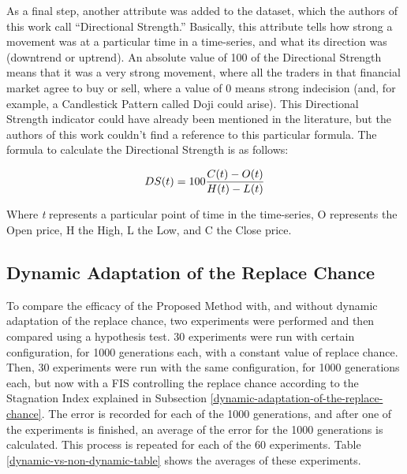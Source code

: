 \documentclass[12pt,journal,draftcls,onecolumn]{IEEEtran}
\begin{document}
As a final step, another attribute was added to the dataset, which the authors of this work call ``Directional Strength.'' Basically, this attribute tells how strong a movement was at a particular time in a time-series, and what its direction was (downtrend or uptrend). An absolute value of 100 of the Directional Strength means that it was a very strong movement, where all the traders in that financial market agree to buy or sell, where a value of 0 means strong indecision (and, for example, a Candlestick Pattern called Doji could arise). This Directional Strength indicator could have already been mentioned in the literature, but the authors of this work couldn't find a reference to this particular formula. The formula to calculate the Directional Strength is as follows:

\begin{equation} \label{directional-strength}
  DS(t) = 100{{C(t) - O(t)} \over {H(t) - L(t)}}
\end{equation}

Where \textit{t} represents a particular point of time in the time-series, O represents the Open price, H the High, L the Low, and C the Close price.

\subsection{Dynamic Adaptation of the Replace Chance}

To compare the efficacy of the Proposed Method with, and without dynamic adaptation of the replace chance, two experiments were performed and then compared using a hypothesis test. 30 experiments were run with certain configuration, for 1000 generations each, with a constant value of replace chance. Then, 30 experiments were run with the same configuration, for 1000 generations each, but now with a FIS controlling the replace chance according to the Stagnation Index explained in Subsection \ref{dynamic-adaptation-of-the-replace-chance}. The error is recorded for each of the 1000 generations, and after one of the experiments is finished, an average of the error for the 1000 generations is calculated. This process is repeated for each of the 60 experiments. Table \ref{dynamic-vs-non-dynamic-table} shows the averages of these experiments.
\end{document}
